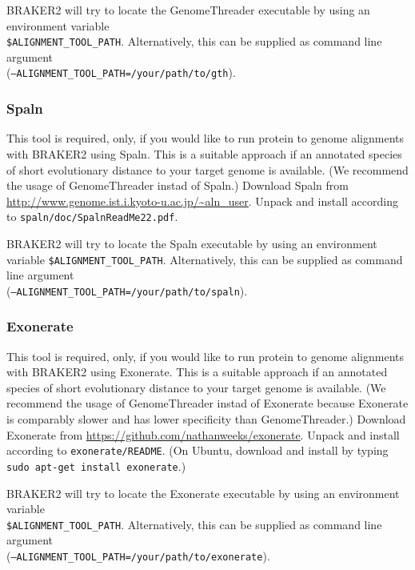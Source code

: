 \documentclass[a4paper,10pt]{report}
\begin{document}
BRAKER2 will try to locate the GenomeThreader executable by using an environment variable\\\texttt{\$ALIGNMENT\_TOOL\_PATH}. Alternatively, this can be supplied as command line argument \\(\texttt{--ALIGNMENT\_TOOL\_PATH=/your/path/to/gth}).

\subsubsection{Spaln}

This tool is required, only, if you would like to run protein to genome alignments with BRAKER2 using Spaln. This is a suitable approach if an annotated species of short evolutionary distance to your target genome is available. (We recommend the usage of GenomeThreader instad of Spaln.) Download Spaln from \url{http://www.genome.ist.i.kyoto-u.ac.jp/~aln_user}. Unpack and install according to \texttt{spaln/doc/SpalnReadMe22.pdf}.

BRAKER2 will try to locate the Spaln executable by using an environment variable \texttt{\$ALIGNMENT\_TOOL\_PATH}. Alternatively, this can be supplied as command line argument \\(\texttt{--ALIGNMENT\_TOOL\_PATH=/your/path/to/spaln}).

\subsubsection{Exonerate}

This tool is required, only, if you would like to run protein to genome alignments with BRAKER2 using Exonerate. This is a suitable approach if an annotated species of short evolutionary distance to your target genome is available. (We recommend the usage of GenomeThreader instad of Exonerate because Exonerate is comparably slower and has lower specificity than GenomeThreader.) Download Exonerate from \url{https://github.com/nathanweeks/exonerate}. Unpack and install according to \texttt{exonerate/README}. (On Ubuntu, download and install by typing  \texttt{sudo apt-get install exonerate}.)

BRAKER2 will try to locate the Exonerate executable by using an environment variable \\\texttt{\$ALIGNMENT\_TOOL\_PATH}. Alternatively, this can be supplied as command line argument \\(\texttt{--ALIGNMENT\_TOOL\_PATH=/your/path/to/exonerate}).
\end{document}
